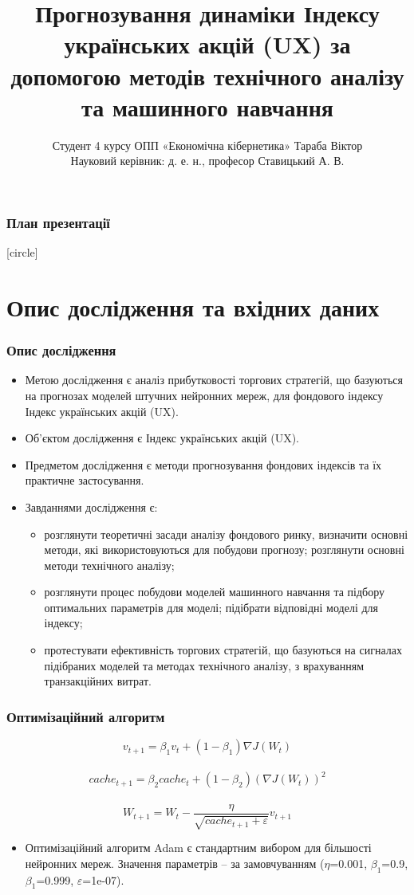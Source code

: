 \documentclass[aspectratio=169]{beamer}
\title{Прогнозування динаміки Індексу українських акцій (UX) за допомогою методів технічного аналізу та машинного навчання}
\author{Студент 4 курсу ОПП «Економічна кібернетика» Тараба Віктор\\ Науковий керівник: д. е. н., професор Ставицький А. В.}
\institute{Київський національний університет імені Тараса Шевченка\\Економічний факультет\\Кафедра економічної кібернетики}
\begin{document}
	
\begin{frame}
\titlepage
\end{frame}

\begin{frame}
\frametitle{План презентації}
[circle]
\tableofcontents
\end{frame}

\section{Опис дослідження та вхідних даних}

\begin{frame}
\frametitle{Опис дослідження}
\begin{itemize}
\item \alert {Метою дослідження}  є  аналіз  прибутковості  торгових  стратегій, що базуються  на  прогнозах  моделей  штучних  нейронних  мереж,  для  фондового індексу Індекс українських акцій (UX).
\tinyskip
\item \alert {Об’єктом дослідження} є Індекс українських акцій (UX).
\tinyskip
\item \alert {Предметом дослідження} є методи прогнозування фондових індексів та їх практичне застосування.
\tinyskip
\item \alert {Завданнями дослідження} є:
\begin{itemize}
    \item[\textcolor{orange}{\textbullet}] розглянути теоретичні засади аналізу фондового ринку, визначити основні методи, які використовуються для побудови прогнозу; розглянути основні методи технічного аналізу; 
    \item[\textcolor{orange}{\textbullet}] розглянути процес побудови  моделей машинного навчання та підбору оптимальних параметрів для моделі; підібрати відповідні моделі для індексу; 
    \item[\textcolor{orange}{\textbullet}] протестувати ефективність торгових стратегій, що базуються на сигналах підібраних  моделей та методах технічного аналізу, з врахуванням транзакційних витрат. 
\end{itemize}
\end{itemize}
\end{frame}

\begin{frame}
\frametitle{Оптимізаційний алгоритм}
\[ v_{t+1} = \beta_{1} v_{t} + (1-\beta_{1})\nabla J(W_{t}) \]\\
\[ cache_{t+1} = \beta_{2} cache_{t} + (1-\beta_{2})(\nabla J(W_{t}))^{2} \]\\
\[ W_{t+1} = W_{t}-\frac{\eta}{\sqrt{cache_{t+1}+\varepsilon}}v_{t+1} \]
\bigskip
\begin{itemize}
\item \alert {Оптимізаційний алгоритм Adam} є стандартним вибором для більшості нейронних мереж. Значення параметрів – за замовчуванням ($\eta$=0.001, $\beta_{1}$=0.9, $\beta_{1}$=0.999, $\varepsilon$=1e-07). 
\end{itemize}
\end{frame}
\end{document}
